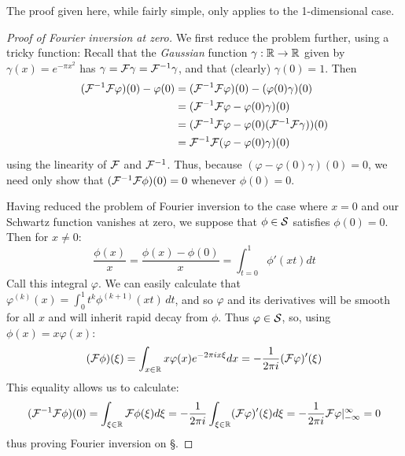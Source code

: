     \begin{rmk}
      The proof given here, while fairly simple, only applies to the 1-dimensional case. 
    \end{rmk}
    \begin{proof}[Proof of Fourier inversion at zero]
      We first reduce the problem further, using a tricky function:
      Recall that the \emph{Gaussian} function $\gamma:\R\rightarrow\R$ given by $\gamma(x) = e^{-\pi x^2}$ has $\gamma=\F\gamma=\F^{-1}\gamma$, and that (clearly) $\gamma(0)=1$.
      Then 
      \begin{align*}
        (\F^{-1}\F\varphi)(0) - \varphi(0) &= (\F^{-1}\F\varphi)(0) - (\varphi(0)\gamma)(0)\\
        &= (\F^{-1}\F\varphi - \varphi(0)\gamma)(0)\\
        &= (\F^{-1}\F\varphi - \varphi(0)(\F^{-1}\F\gamma))(0)\\
        &= \F^{-1}\F(\varphi-\varphi(0)\gamma)(0)
      \end{align*}
      using the linearity of $\F$ and $\F^{-1}$.
      Thus, because $(\varphi-\varphi(0)\gamma)(0)=0$, we need only show that $(\F^{-1}\F\phi)(0) = 0$ whenever $\phi(0)=0$.

      Having reduced the problem of Fourier inversion to the case where $x=0$ and our Schwartz function vanishes at zero, we suppose that $\phi\in\S$ satisfies $\phi(0)=0$. 
      Then for $x\ne0$:
      \begin{equation*}
        \frac{\phi(x)}{x} = \frac{\phi(x)-\phi(0)}{x} = \int_{t=0}^1 \phi'(xt)dt
      \end{equation*}
      Call this integral $\varphi$.
      We can easily calculate that $\varphi^{(k)}(x) = \int_0^1t^k\phi^{(k+1)}(xt)\,dt$, and so $\varphi$ and its derivatives will be smooth for all $x$ and will inherit rapid decay from $\phi$.
      Thus $\varphi\in\S$, so, using $\phi(x) = x\varphi(x)$:
      \begin{equation*}
        (\F\phi)(\xi) = \int_{x\in\R} x\varphi(x)e^{-2\pi i x \xi}dx = -\frac{1}{2\pi i}(\F\varphi)'(\xi)
      \end{equation*}
      This equality allows us to calculate:
      \begin{equation*}
        (\F^{-1}\F\phi)(0) = \int_{\xi\in\R} \F\phi(\xi)d\xi = -\frac{1}{2\pi i}\int_{\xi\in\R} (\F\varphi)'(\xi)d\xi = -\frac{1}{2\pi i} \F\varphi\vert_{-\infty}^\infty = 0
      \end{equation*}
      thus proving Fourier inversion on \S.
    \end{proof}

